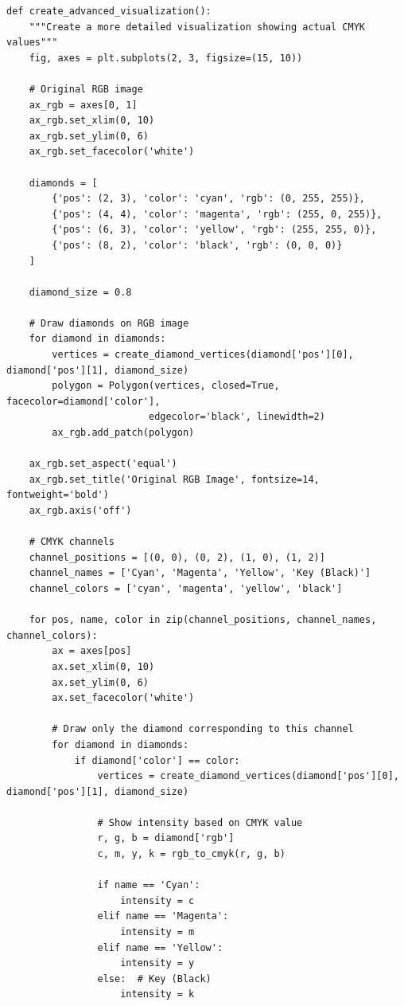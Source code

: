 \documentclass{article}
\begin{document}
\begin{lstlisting}
def create_advanced_visualization():
    """Create a more detailed visualization showing actual CMYK values"""
    fig, axes = plt.subplots(2, 3, figsize=(15, 10))
    
    # Original RGB image
    ax_rgb = axes[0, 1]
    ax_rgb.set_xlim(0, 10)
    ax_rgb.set_ylim(0, 6)
    ax_rgb.set_facecolor('white')
    
    diamonds = [
        {'pos': (2, 3), 'color': 'cyan', 'rgb': (0, 255, 255)},
        {'pos': (4, 4), 'color': 'magenta', 'rgb': (255, 0, 255)},
        {'pos': (6, 3), 'color': 'yellow', 'rgb': (255, 255, 0)},
        {'pos': (8, 2), 'color': 'black', 'rgb': (0, 0, 0)}
    ]
    
    diamond_size = 0.8
    
    # Draw diamonds on RGB image
    for diamond in diamonds:
        vertices = create_diamond_vertices(diamond['pos'][0], diamond['pos'][1], diamond_size)
        polygon = Polygon(vertices, closed=True, facecolor=diamond['color'], 
                         edgecolor='black', linewidth=2)
        ax_rgb.add_patch(polygon)
    
    ax_rgb.set_aspect('equal')
    ax_rgb.set_title('Original RGB Image', fontsize=14, fontweight='bold')
    ax_rgb.axis('off')
    
    # CMYK channels
    channel_positions = [(0, 0), (0, 2), (1, 0), (1, 2)]
    channel_names = ['Cyan', 'Magenta', 'Yellow', 'Key (Black)']
    channel_colors = ['cyan', 'magenta', 'yellow', 'black']
    
    for pos, name, color in zip(channel_positions, channel_names, channel_colors):
        ax = axes[pos]
        ax.set_xlim(0, 10)
        ax.set_ylim(0, 6)
        ax.set_facecolor('white')
        
        # Draw only the diamond corresponding to this channel
        for diamond in diamonds:
            if diamond['color'] == color:
                vertices = create_diamond_vertices(diamond['pos'][0], diamond['pos'][1], diamond_size)
                
                # Show intensity based on CMYK value
                r, g, b = diamond['rgb']
                c, m, y, k = rgb_to_cmyk(r, g, b)
                
                if name == 'Cyan':
                    intensity = c
                elif name == 'Magenta':
                    intensity = m
                elif name == 'Yellow':
                    intensity = y
                else:  # Key (Black)
                    intensity = k
                

\end{lstlisting}
\end{document}
